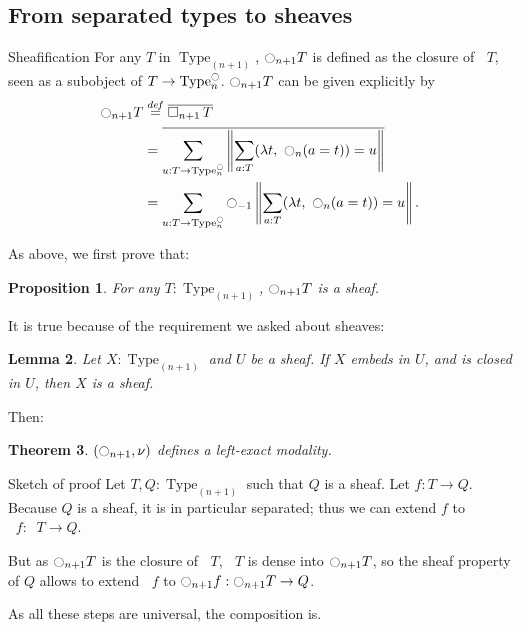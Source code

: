 \documentclass{beamer}
\newtheorem{thm}{Theorem}
\newtheorem{prop}[thm]{Proposition}
\newtheorem{lem}[thm]{Lemma}
\newcommand \defeq {\overset{de\hspace{-0.2ex}f}{=}}
\DeclareMathOperator{\Type}{Type}
\newcommand{\modal}{\ensuremath{\ocircle}}
\newcommand \separated {\mathop{\square_{n+1}} }
\newcommand{\nType}[1]{\Type_{#1}}
\begin{document}
\subsection[Sheafification]{From separated types to sheaves}
\label{sec:from-separated-sheaves}

\begin{frame}{}{Sheafification}
  \note{ }
  For any $T$ in $\nType {(n+1)}$, 
  $\modal_{n+1}T$ is defined as the closure of $\separated T$,
  seen as a subobject of $T \to \nType n^\modal$. 
  $\modal_{n+1}T$ can be given explicitly by
  \begin{align*}
    \modal_{n+1} T &\defeq \overline{\separated T} \\
    &= \overline{\sum_{u:T \to \nType n^\modal}\left\| \sum_{a:T} 
      (\lambda t,~\modal_n (a=t)) = u\right\|} \\
    &= \sum_{u:T \to \nType n^\modal} \modal_{-1}\left\| \sum_{a:T} 
      (\lambda t,~\modal_n (a=t)) = u\right\|.
\end{align*}
\end{frame}

\begin{frame}
  \note{ }
  As above, we first prove that:
  \begin{prop}
    For any $T:\nType {(n+1)}$, $\modal_{n+1}T$ is a sheaf.
  \end{prop}
  It is true because of the requirement we asked about sheaves:
  \begin{lem}
    Let $X:\nType {(n+1)}$ and $U$ be a sheaf. If $X$ embeds
    in $U$, and is closed in $U$, then $X$ is a sheaf.
  \end{lem}

  \pause
  \vspace{1em}

  Then:
  \begin{thm}
    $(\modal_{n+1},\nu)$ defines a left-exact modality.
  \end{thm}
\end{frame}

\begin{frame}{Sketch of proof}
  Let $T,Q:\nType {(n+1)}$ such that $Q$ is a sheaf. Let $f:T\to Q$.
  Because $Q$ is a sheaf, it is in particular separated;
  thus we can extend $f$ to $\separated f:\separated T\to Q$.
  \pause
  \vspace{1em}

  But as $\modal_{n+1} T$ is the closure of $\separated T$, $\separated T$ is dense
  into $\modal_{n+1} T$, so the sheaf property of $Q$ allows to extend
  $\separated f$ to $\modal_{n+1} f:\modal_{n+1} T \to Q$.

  As all these steps are universal, the composition is.
\end{frame}
\end{document}
